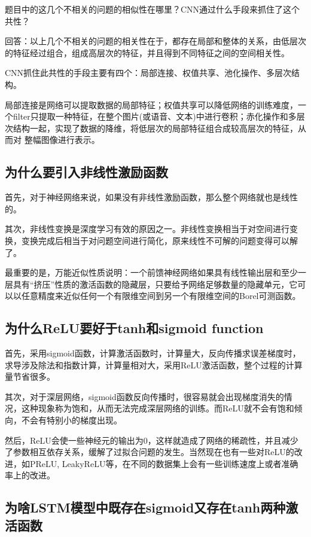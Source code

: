 题目中的这几个不相关的问题的相似性在哪里？CNN通过什么手段来抓住了这个共性？

回答：以上几个不相关的问题的相关性在于，都存在局部和整体的关系，由低层次的特征经过组合，组成高层次的特征，并且得到不同特征之间的空间相关性。

CNN抓住此共性的手段主要有四个：局部连接、权值共享、池化操作、多层次结构。

局部连接是网络可以提取数据的局部特征；权值共享可以降低网络的训练难度，一个filter只提取一种特征，在整个图片(或语音、文本)中进行卷积；赤化操作和多层次结构一起，实现了数据的降维，将低层次的局部特征组合成较高层次的特征，从而对
整幅图像进行表示。

\subsection{为什么要引入非线性激励函数}

首先，对于神经网络来说，如果没有非线性激励函数，那么整个网络就也是线性的。

其次，非线性变换是深度学习有效的原因之一。非线性变换相当于对空间进行变换，变换完成后相当于对问题空间进行简化，原来线性不可解的问题变得可以解了。

最重要的是，万能近似性质说明：一个前馈神经网络如果具有线性输出层和至少一层具有“挤压”性质的激活函数的隐藏层，只要给予网络足够数量的隐藏单元，它可以以任意精度来近似任何一个有限维空间到另一个有限维空间的Borel可测函数。

\subsection{为什么ReLU要好于tanh和sigmoid function}

首先，采用sigmoid函数，计算激活函数时，计算量大，反向传播求误差梯度时，求导涉及除法和指数计算，计算量相对大，采用ReLU激活函数，整个过程的计算量节省很多。

其次，对于深层网络，sigmoid函数反向传播时，很容易就会出现梯度消失的情况，这种现象称为饱和，从而无法完成深层网络的训练。而ReLU就不会有饱和倾向，不会有特别小的梯度出现。

然后，ReLU会使一些神经元的输出为0，这样就造成了网络的稀疏性，并且减少了参数相互依存关系，缓解了过拟合问题的发生。当然现在也有一些对ReLU的改进，如PReLU, LeakyReLU等，在不同的数据集上会有一些训练速度上或者准确率上的改进。

\subsection{为啥LSTM模型中既存在sigmoid又存在tanh两种激活函数}

